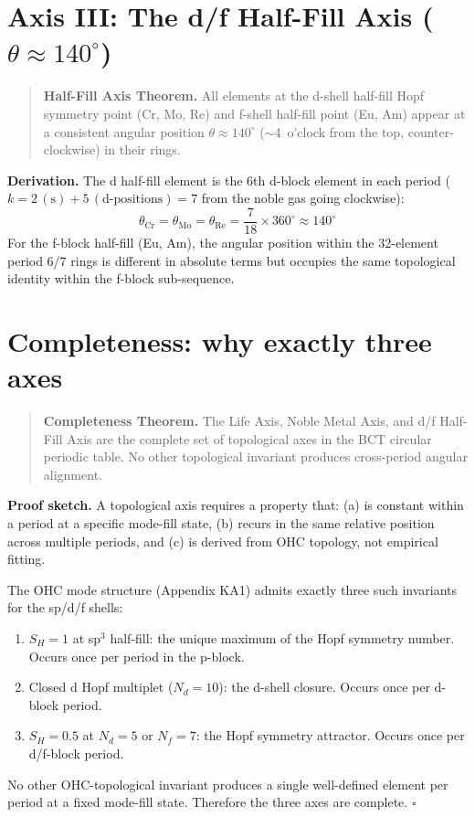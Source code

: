 \documentclass[aps,prl,onecolumn,superscriptaddress]{revtex4-2}
\begin{document}
\section{Axis III: The d/f Half-Fill Axis ($\theta \approx 140^\circ$)}

\begin{quotation}
\textbf{Half-Fill Axis Theorem.}
All elements at the d-shell half-fill Hopf symmetry point
(Cr, Mo, Re) and f-shell half-fill point (Eu, Am) appear
at a consistent angular position $\theta \approx 140^\circ$
($\sim$4~o'clock from the top, counter-clockwise) in their rings.
\end{quotation}

\textbf{Derivation.}
The d half-fill element is the 6th d-block element in each period
($k = 2\,(\text{s}) + 5\,(\text{d-positions}) = 7$ from the
noble gas going clockwise):
%
\begin{equation}
  \theta_\mathrm{Cr} = \theta_\mathrm{Mo} = \theta_\mathrm{Re}
  = \frac{7}{18} \times 360^\circ \approx 140^\circ
\end{equation}
%
For the f-block half-fill (Eu, Am), the angular position within
the 32-element period 6/7 rings is different in absolute terms
but occupies the same topological identity within the f-block
sub-sequence.

\section{Completeness: why exactly three axes}

\begin{quotation}
\textbf{Completeness Theorem.}
The Life Axis, Noble Metal Axis, and d/f Half-Fill Axis
are the complete set of topological axes in the BCT
circular periodic table. No other topological invariant
produces cross-period angular alignment.
\end{quotation}

\textbf{Proof sketch.}
A topological axis requires a property that:
(a) is constant within a period at a specific mode-fill state,
(b) recurs in the same relative position across multiple periods, and
(c) is derived from OHC topology, not empirical fitting.

The OHC mode structure (Appendix KA1) admits exactly three
such invariants for the sp/d/f shells:
\begin{enumerate}
\item $S_H = 1$ at sp$^3$ half-fill: the unique maximum of the
  Hopf symmetry number. Occurs once per period in the p-block.
\item Closed d Hopf multiplet ($N_d = 10$): the d-shell closure.
  Occurs once per d-block period.
\item $S_H = 0.5$ at $N_d = 5$ or $N_f = 7$: the Hopf symmetry
  attractor. Occurs once per d/f-block period.
\end{enumerate}
No other OHC-topological invariant produces a single well-defined
element per period at a fixed mode-fill state. Therefore the
three axes are complete. $\square$
\end{document}
